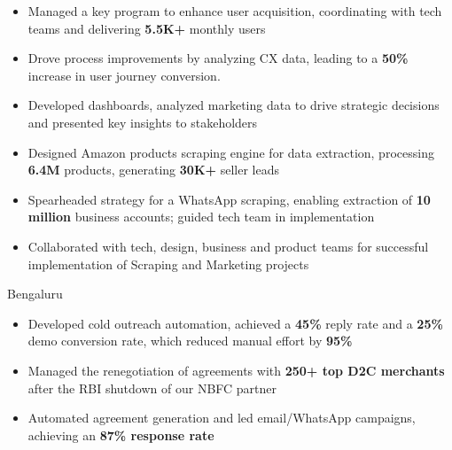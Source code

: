 \documentclass[10pt,a4paper]{altacv}
\begin{document}
\newcommand{\cvtagwhite}[1]{%
  \mbox{\tikz[baseline=-0.6ex]%
    \node[anchor=base, draw=none, rounded corners=0.2ex, inner sep=0.4ex, text=white, fill=white]%
    {\small\strut #1};}%
  }%

\name{\textcolor{SlateGrey}{SHIKHAR SHARMA}}


\begin{fullwidth}
\makecvheader
\end{fullwidth}


\begin{itemize}
\item Managed a key program to enhance user acquisition, coordinating with tech teams and delivering \textbf{5.5K+} monthly users
\item Drove process improvements by analyzing CX data, leading to a \textbf{50\%} increase in user journey conversion.
\item Developed dashboards, analyzed marketing data to drive strategic decisions and presented key insights to stakeholders
\item Designed Amazon products scraping engine for data extraction, processing \textbf{6.4M} products, generating \textbf{30K+} seller leads
\item  Spearheaded strategy for a WhatsApp scraping, enabling extraction of \textbf{10 million} business accounts; guided tech team in implementation
\item Collaborated with tech, design, business and product teams for successful implementation of Scraping and Marketing projects
\end{itemize}

  {Bengaluru}
\begin{itemize}
\item Developed cold outreach automation, achieved a \textbf{45\% }reply rate and a \textbf{25\%} demo conversion rate, which reduced manual effort by \textbf{95\% }
\item Managed the renegotiation of agreements with \textbf{250+ top D2C merchants} after the RBI shutdown of our NBFC partner
\item Automated agreement generation and led email/WhatsApp campaigns, achieving an \textbf{87\% response rate} 
\end{itemize}
\end{document}
